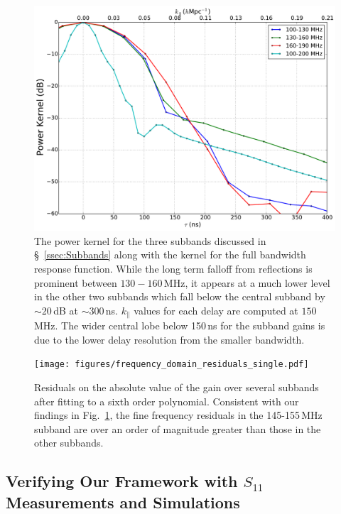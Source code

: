 \documentclass[twocolumn]{emulateapj}
\begin{document}
\begin{figure}[h!]
\includegraphics[width=.5\textwidth]{figures/powerKernelSubbands.pdf}
\caption{The power kernel for the three subbands discussed in \S~\ref{ssec:Subbands} along with the kernel for the full bandwidth response function. While the long term falloff from reflections is prominent between $130-160$\,MHz, it appears at a much lower level in the other two subbands which fall below the central subband by $\sim 20$\,dB at $\sim 300$\,ns. $k_\parallel$ values for each delay are computed at $150$\,MHz. The wider central lobe below 150\,ns for the subband gains is due to the lower delay resolution from the smaller bandwidth.}
\label{fig:KernelsSubbands}
\end{figure}

\begin{figure}
\texttt{[image: figures/frequency\_domain\_residuals\_single.pdf]}
\caption{Residuals on the absolute value of the gain over several subbands after fitting to a sixth order polynomial. Consistent with our findings in Fig.~\ref{fig:KernelsSubbands}, the fine frequency residuals in the 145-155\,MHz subband are over an order of magnitude greater than those in the other subbands.}
\label{fig:Residuals}
\end{figure}

\subsection{Verifying Our Framework with $S_{11}$ Measurements and Simulations}\label{ssec:S11}
\end{document}
